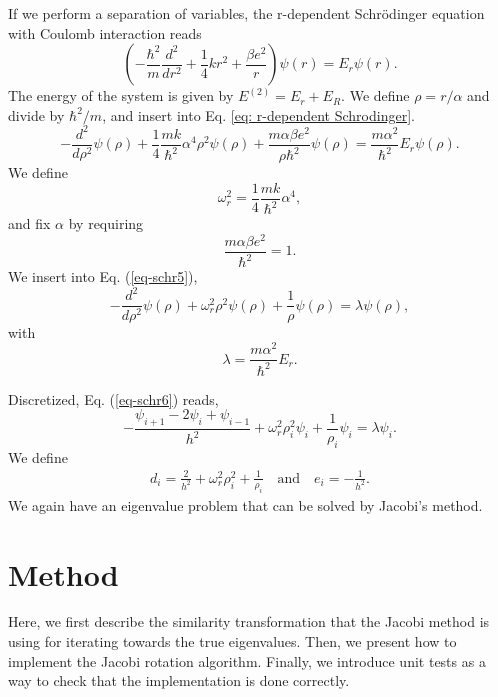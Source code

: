 \documentclass[a4paper]{article}
\begin{document}
If we perform a separation of variables, the r-dependent Schrödinger equation with Coulomb interaction reads
\begin{equation}\label{eq: r-dependent Schrodinger}
\left(  -\frac{\hbar^2}{m} \frac{d^2}{dr^2}+ \frac{1}{4}k r^2+\frac{\beta e^2}{r}\right)\psi(r)  = E_r \psi(r).
\end{equation}
The energy of the system is given by $E^{(2)} = E_r + E_R$.
We define $\rho = r/\alpha$ and divide by $\hbar^2/m$, and insert into Eq. \eqref{eq: r-dependent Schrodinger}.
\begin{equation}
  -\frac{d^2}{d\rho^2} \psi(\rho)
       + \frac{1}{4}\frac{mk}{\hbar^2} \alpha^4\rho^2\psi(\rho)+\frac{m\alpha \beta e^2}{\rho\hbar^2}\psi(\rho)  =
\frac{m\alpha^2}{\hbar^2}E_r \psi(\rho) .
\end{equation}
We define
\begin{equation}
\omega_r^2=\frac{1}{4}\frac{mk}{\hbar^2} \alpha^4,
\end{equation}
and fix $\alpha$ by requiring
\begin{equation}
\frac{m\alpha \beta e^2}{\hbar^2}=1.
\end{equation}
We insert into Eq. (\ref{eq-schr5}),
\begin{equation}
  -\frac{d^2}{d\rho^2} \psi(\rho) + \omega_r^2\rho^2\psi(\rho) +\frac{1}{\rho}\psi(\rho) = \lambda \psi(\rho),
\label{eq-schr6}
\end{equation}
with
\begin{equation}
\lambda = \frac{m\alpha^2}{\hbar^2}E_r.
\end{equation}

Discretized, Eq. (\ref{eq-schr6}) reads,
\begin{equation}\label{eq: two electrons discretized}
 -\frac{\psi_{i+1} -2\psi_i +\psi_{i-1}}{h^2} + \omega_r^2\rho_i^2\psi_i +\frac{1}{\rho_i}\psi_i = \lambda \psi_i.
\end{equation}
We define
\begin{align}
d_i = \frac{2}{h^2} + \omega_r^2\rho_i^2 + \frac{1}{\rho_i}\quad\text{and}\quad e_i = -\frac{1}{h^2}.
\end{align}
We again have an eigenvalue problem that can be solved by Jacobi's method.



\section{Method}

Here, we first describe the similarity transformation that the Jacobi method is using for iterating towards the true eigenvalues. Then, we present how to implement the Jacobi rotation algorithm. Finally, we introduce unit tests as a way to check that the implementation is done correctly.
\end{document}
